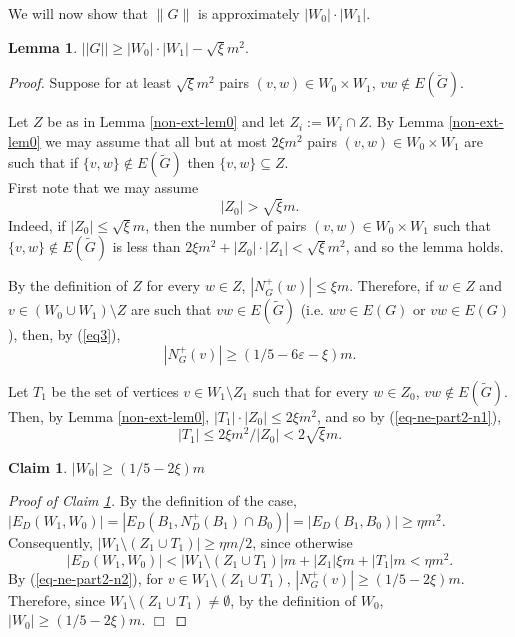 \documentclass{article}
\newtheorem{lemma}[theorem]{Lemma}
\newtheorem{claim}[theorem]{Claim}
\renewcommand{\epsilon}{{\varepsilon}}
\begin{document}
We will now show that $\|G\|$ is approximately $|W_0|\cdot |W_1|.$ 
\begin{lemma}\label{non-ext-lem1}
 $||G||\geq |W_0|\cdot |W_1|-\sqrt{\xi}m^2.$
\end{lemma}
\begin{proof}Suppose for at least $\sqrt{\xi} m^2$ pairs $(v,w)\in W_0\times W_1$, $vw \notin E(\widetilde{G})$. 

Let $Z$ be as in Lemma \ref{non-ext-lem0} and let $Z_i:= W_i\cap Z$. By Lemma \ref{non-ext-lem0} we may assume that all but at most $2\xi m^2$ pairs $(v,w)\in W_0 \times W_1$ are such that if $\{v,w\}\notin E(\widetilde{G})$ then $\{v,w\}\subseteq Z.$\\
First note that we may assume   \begin{equation}\label{eq-ne-part2-n1}|Z_0|>\sqrt{\xi}m.
\end{equation}Indeed, if  $|Z_0|\leq \sqrt{\xi}m$, then the number of pairs $(v,w)\in W_0 \times W_1$ such that  $\{v,w\}\notin E(\widetilde{G})$ is less than $2\xi m^2+ |Z_0|\cdot |Z_1|< \sqrt{\xi}m^2$, and so the lemma holds.

By the definition of $Z$ for every $w\in Z$, $|N^+_G(w)|\leq \xi m$. Therefore, if $w\in Z$ and $v\in (W_0\cup W_1)\setminus Z$ are such that $vw \in E(\widetilde{G})$ (i.e. $wv\in E(G)$ or $vw\in E(G)$), then, by (\ref{eq3}), 
\begin{equation}\label{eq-ne-part2-n2}|N^+_G(v)|\geq (1/5-6\epsilon - \xi)m.
\end{equation}


Let $T_1$ be the set of vertices $v\in W_1\setminus Z_1$ such that for every $w\in Z_0$, $vw \notin E(\widetilde{G}).$
Then, by Lemma \ref{non-ext-lem0}, $|T_1|\cdot |Z_{0}| \leq 2\xi m^2$, and so by (\ref{eq-ne-part2-n1}),
$$|T_1|\leq 2\xi m^2/|Z_{0}|<2\sqrt{\xi} m.$$

\begin{claim}\label{nonext-case2-cl1n}
    $|W_0|\geq (1/5-2\xi)m$
\end{claim}
{\it{Proof of Claim \ref{nonext-case2-cl1n}}.}
By the definition of the case,  $|E_D(W_1, W_0)|=|E_D(B_1, N^+_D(B_1)\cap B_0)|=|E_D(B_1, B_0)|\geq \eta m^2.$ Consequently, $|W_1\setminus (Z_1\cup T_1)|\geq \eta m/2$, since otherwise
$$|E_D(W_1, W_0)|<|W_1\setminus (Z_1\cup T_1)|m+ |Z_1|\xi m + |T_1|m<\eta m^2.$$
By (\ref{eq-ne-part2-n2}), for $v\in W_1\setminus (Z_1\cup T_1)$, $|N^+_G(v)|\geq (1/5-2\xi)m$. Therefore, since $W_1\setminus (Z_1\cup T_1)\neq \emptyset$, by the definition of $W_0$, $|W_0|\geq  (1/5-2\xi)m$. 
$\Box$


\end{proof}
\end{document}

